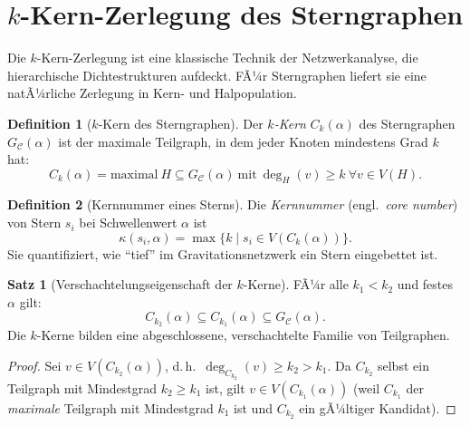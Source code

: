 ﻿\documentclass[a4paper,12pt]{report}
\theoremstyle{definition}
\newtheorem{definition}{Definition}
\newtheorem{satz}{Satz}
\begin{document}
\section{$k$-Kern-Zerlegung des Sterngraphen}
\label{sec:kcore}

Die $k$-Kern-Zerlegung ist eine klassische Technik der Netzwerkanalyse, die hierar\-chische Dichte\-strukturen aufdeckt. FÃ¼r Sterngraphen liefert sie eine natÃ¼rliche Zerlegung in Kern- und Halpopulation.

\begin{definition}[$k$-Kern des Sterngraphen]
\label{def:kcore}
Der \emph{$k$-Kern} $C_k(\alpha)$ des Sterngraphen $G_\mathcal{C}(\alpha)$ ist der maximale Teilgraph, in dem jeder Knoten mindestens Grad $k$ hat:
\[
C_k(\alpha) = \mathrm{maximal}\ H \subseteq G_\mathcal{C}(\alpha)\ \text{mit}\ \deg_H(v) \geq k\ \forall v \in V(H).
\]
\end{definition}

\begin{definition}[Kernnummer eines Sterns]
\label{def:kernnummer}
Die \emph{Kernnummer} (engl.\ \emph{core number}) von Stern $s_i$ bei Schwellenwert $\alpha$ ist
\[
\kappa(s_i, \alpha) = \max\{k \mid s_i \in V(C_k(\alpha))\}.
\]
Sie quantifiziert, wie ``tief'' im Gravitationsnetzwerk ein Stern eingebettet ist.
\end{definition}

\begin{satz}[Verschachtelungseigenschaft der $k$-Kerne]
\label{satz:verschachtelung}
FÃ¼r alle $k_1 < k_2$ und festes $\alpha$ gilt:
\[
C_{k_2}(\alpha) \subseteq C_{k_1}(\alpha) \subseteq G_\mathcal{C}(\alpha).
\]
Die $k$-Kerne bilden eine abgeschlossene, verschachtelte Familie von Teilgraphen.
\end{satz}

\begin{proof}
Sei $v \in V(C_{k_2}(\alpha))$, d.\,h.\ $\deg_{C_{k_2}}(v) \geq k_2 > k_1$. Da $C_{k_2}$ selbst ein Teilgraph mit Mindestgrad $k_2 \geq k_1$ ist, gilt $v \in V(C_{k_1}(\alpha))$ (weil $C_{k_1}$ der \emph{maximale} Teilgraph mit Mindestgrad $k_1$ ist und $C_{k_2}$ ein gÃ¼ltiger Kandidat).
\end{proof}
\end{document}
